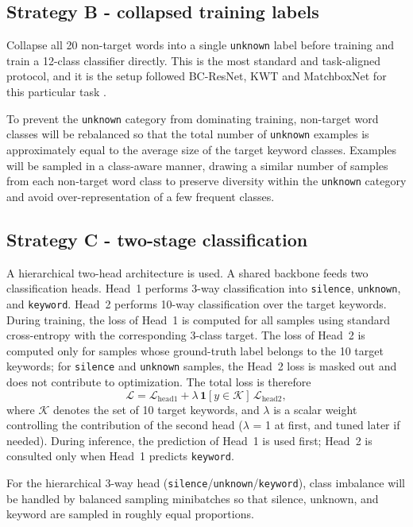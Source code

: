 \documentclass[11pt]{article}
\begin{document}
\subsection*{Strategy B - collapsed training labels}

Collapse all 20 non-target words into a single \texttt{unknown} label before training and train a 12-class classifier directly. This is the most standard and task-aligned protocol, and it is the setup followed BC-ResNet, KWT and MatchboxNet for this particular task \cite{bcresnet,kwt,matchbox}.

To prevent the \texttt{unknown} category from dominating training, non-target word classes will be rebalanced so that the total number of \texttt{unknown} examples is approximately equal to the average size of the target keyword classes. Examples will be sampled in a class-aware manner, drawing a similar number of samples from each non-target word class to preserve diversity within the \texttt{unknown} category and avoid over-representation of a few frequent classes.

\subsection*{Strategy C - two-stage classification}

A hierarchical two-head architecture is used. A shared backbone feeds two classification heads. Head~1 performs 3-way classification into \texttt{silence}, \texttt{unknown}, and \texttt{keyword}. Head~2 performs 10-way classification over the target keywords. During training, the loss of Head~1 is computed for all samples using standard cross-entropy with the corresponding 3-class target. The loss of Head~2 is computed only for samples whose ground-truth label belongs to the 10 target keywords; for \texttt{silence} and \texttt{unknown} samples, the Head~2 loss is masked out and does not contribute to optimization. The total loss is therefore
\[
\mathcal{L} = \mathcal{L}_{\text{head1}} + \lambda \,\mathbf{1}[y \in \mathcal{K}]\, \mathcal{L}_{\text{head2}},
\]
where \(\mathcal{K}\) denotes the set of 10 target keywords, and \(\lambda\) is a scalar weight controlling the contribution of the second head (\(\lambda\) = 1 at first, and tuned later if needed). During inference, the prediction of Head~1 is used first; Head~2 is consulted only when Head~1 predicts \texttt{keyword}.

For the hierarchical 3-way head (\texttt{silence}/\texttt{unknown}/\texttt{keyword}), class imbalance will be handled by balanced sampling minibatches so that silence, unknown, and keyword are sampled in roughly equal proportions.
\end{document}
